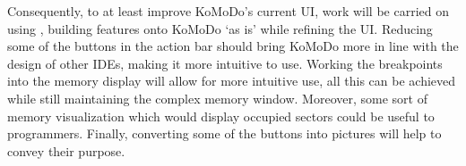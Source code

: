     Consequently, to at least improve KoMoDo's current UI, work will be carried on using , building features onto KoMoDo `as is' while refining the UI. Reducing some of the buttons in the action bar should bring KoMoDo more in line with the design of other IDEs, making it more intuitive to use. Working the breakpoints into the memory display will allow for more intuitive use, all this can be achieved while still maintaining the complex memory window. Moreover, some sort of memory visualization which would display occupied sectors could be useful to programmers. Finally, converting some of the buttons into pictures will help to convey their purpose.
  \\
  \\

